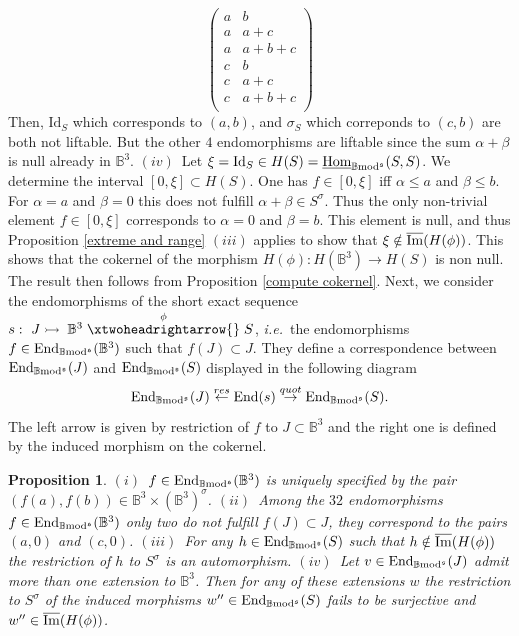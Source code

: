 \documentclass[12pt]{article}
\newtheorem{prop}[thm]{Proposition}
\def\End{{\rm End}}
\def\Homi{{\underline{\rm Hom}}}
\def\id{{\rm id}}
\def\B{{\mathbb B}}
\def\imm{\overline{\rm Im}}
\newcommand{\ie}{{\it i.e.\/}\ }
\def\id{{\mbox{Id}}}
\def\End{{\mbox{End}}}
\def\b2{{\rm \B mod^{\mathfrak s}}}
\begin{document}
$$
\left(
\begin{array}{cc}
 a & b \\
 a & a+c \\
 a & a+b+c \\
 c & b \\
 c & a+c \\
 c & a+b+c \\
\end{array}
\right)
$$
 Then, $\id_S$ which corresponds to $(a,b)$, and $\sigma_S$ which correponds to $(c,b)$ are both not liftable. But the other $4$ endomorphisms are liftable since the sum $\alpha+\beta$ is null already in $\B^3$. 
\newline
$(iv)$~Let $\xi=\id_S\in H(S)=\Homi_\b2(S,S)$. We determine the interval $[0,\xi]\subset  H(S)$. One has $f\in [0,\xi]$ iff $\alpha\leq a$ and $\beta \leq b$. For $\alpha= a$ and $\beta =0$ this does not fulfill $\alpha + \beta\in S^\sigma$. Thus the only non-trivial element $f\in [0,\xi]$ corresponds to
$\alpha= 0$ and $\beta =b$. This element is null, and thus Proposition \ref{extreme and range} $(iii)$ applies to show that $\xi\notin \imm(H(\phi))$.  This shows that the cokernel of the morphism $H(\phi):H(\B^3)\to H(S)$ is non null.
The result then follows from Proposition \ref{compute cokernel}.\endproof 
Next, we consider the endomorphisms of the short exact  sequence $s:~J\stackrel{}{\rightarrowtail{}} \B^3 \stackrel{\phi}{\xtwoheadrightarrow{}} S$, \ie the endomorphisms 
$f\in \End_\b2(\B^3)$ such that $f(J)\subset J$. They define a correspondence between $\End_\b2(J)$ and  $\End_\b2(S)$ displayed in the following diagram
\begin{equation}\label{quotient maph}
	\End_\b2(J)\stackrel{{ res}}{\leftarrow} \End(s)\stackrel{{ quot}}{\to} \End_\b2(S).
\end{equation}
The left arrow is given by restriction of $f$ to $J\subset \B^3$ and the right one is defined by the induced morphism on the cokernel.
\begin{prop}\label{shortexactsimple1} $(i)$~$f\in \End_\b2(\B^3)$ is uniquely specified by the pair $(f(a),f(b))\in \B^3\times (\B^3)^\sigma$.\newline
$(ii)$~Among the $32$ endomorphisms $f\in \End_\b2(\B^3)$ only two do not fulfill $f(J)\subset J$, they correspond to the pairs $(a,0)$ and $(c,0)$.\newline
$(iii)$~For any $h\in \End_\b2(S)$ such that $h\notin \imm(H(\phi))$ the restriction  of $h$ to $S^\sigma$ is an automorphism.\newline
 $(iv)$~Let $v\in\End_\b2(J)$  admit more than one extension to $\B^3$. Then for any of these extensions $w$ the restriction to $S^\sigma$ of the induced morphisms  $w''\in \End_\b2(S)$ fails to be surjective and  $w''\in \imm(H(\phi))$.
   \end{prop}
\end{document}
